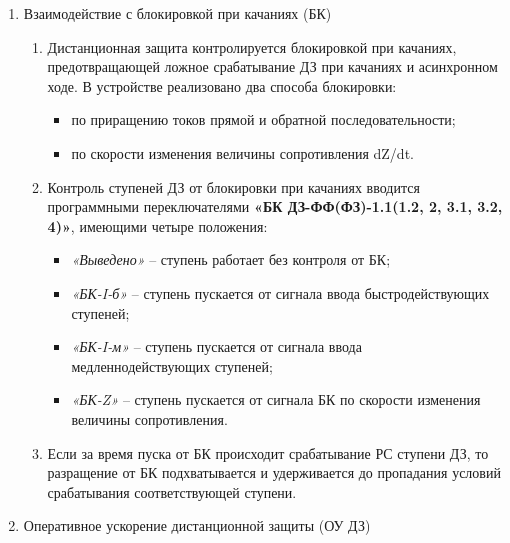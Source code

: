 \begin{enumerate}
\begin{enumerate}
\end{enumerate}


\item\label{sec:secbk} Взаимодействие с блокировкой при качаниях (БК)
\begin{enumerate}

\item
Дистанционная защита контролируется блокировкой при качаниях, предотвращающей ложное
срабатывание ДЗ при качаниях и асинхронном ходе. В устройстве реализовано два способа блокировки:
\begin{itemize}
\item по приращению токов прямой и обратной последовательности;
\item по скорости изменения величины сопротивления dZ/dt.
\end{itemize}

\item
Контроль ступеней ДЗ от блокировки при качаниях вводится программными переключателями
\textbf{«БК ДЗ-ФФ(ФЗ)-1.1(1.2, 2, 3.1, 3.2, 4)»}, имеющими четыре положения:
\begin{itemize}
\item \textit{«Выведено»} -- ступень работает без контроля от БК;
\item \textit{«БК-I-б»} -- ступень пускается от сигнала ввода быстродействующих ступеней;
\item \textit{«БК-I-м»} -- ступень пускается от сигнала ввода медленнодействующих ступеней;
\item \textit{«БК-Z»} -- ступень пускается от сигнала БК по скорости изменения величины сопротивления.
\end{itemize}

\item
Если за время пуска от БК происходит срабатывание РС ступени ДЗ, то разращение от БК
подхватывается и удерживается до пропадания условий срабатывания соответствующей ступени.

\end{enumerate}


\item\label{sec:secou} Оперативное ускорение дистанционной защиты (ОУ ДЗ)
\begin{enumerate}


\end{enumerate}
\end{enumerate}
